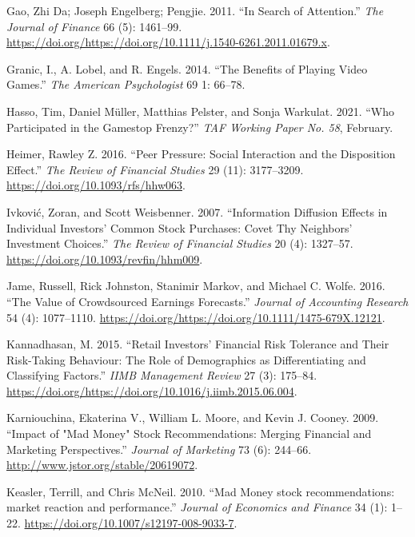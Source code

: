 \documentclass[12pt,]{article}
\begin{document}
\leavevmode\hypertarget{ref-da2011}{}%
Gao, Zhi Da; Joseph Engelberg; Pengjie. 2011. ``In Search of
Attention.'' \emph{The Journal of Finance} 66 (5): 1461--99.
\url{https://doi.org/https://doi.org/10.1111/j.1540-6261.2011.01679.x}.

\leavevmode\hypertarget{ref-granic2014}{}%
Granic, I., A. Lobel, and R. Engels. 2014. ``The Benefits of Playing
Video Games.'' \emph{The American Psychologist} 69 1: 66--78.

\leavevmode\hypertarget{ref-hasso2021}{}%
Hasso, Tim, Daniel Müller, Matthias Pelster, and Sonja Warkulat. 2021.
``Who Participated in the Gamestop Frenzy?'' \emph{TAF Working Paper No.
58}, February.

\leavevmode\hypertarget{ref-heimer2016}{}%
Heimer, Rawley Z. 2016. ``Peer Pressure: Social Interaction and the
Disposition Effect.'' \emph{The Review of Financial Studies} 29 (11):
3177--3209. \url{https://doi.org/10.1093/rfs/hhw063}.

\leavevmode\hypertarget{ref-ivkovic2007}{}%
Ivković, Zoran, and Scott Weisbenner. 2007. ``Information Diffusion
Effects in Individual Investors' Common Stock Purchases: Covet Thy
Neighbors' Investment Choices.'' \emph{The Review of Financial Studies}
20 (4): 1327--57. \url{https://doi.org/10.1093/revfin/hhm009}.

\leavevmode\hypertarget{ref-jame2016}{}%
Jame, Russell, Rick Johnston, Stanimir Markov, and Michael C. Wolfe.
2016. ``The Value of Crowdsourced Earnings Forecasts.'' \emph{Journal of
Accounting Research} 54 (4): 1077--1110.
\url{https://doi.org/https://doi.org/10.1111/1475-679X.12121}.

\leavevmode\hypertarget{ref-kannadhasan2015}{}%
Kannadhasan, M. 2015. ``Retail Investors' Financial Risk Tolerance and
Their Risk-Taking Behaviour: The Role of Demographics as Differentiating
and Classifying Factors.'' \emph{IIMB Management Review} 27 (3):
175--84.
\url{https://doi.org/https://doi.org/10.1016/j.iimb.2015.06.004}.

\leavevmode\hypertarget{ref-karniouchina2009}{}%
Karniouchina, Ekaterina V., William L. Moore, and Kevin J. Cooney. 2009.
``Impact of "Mad Money" Stock Recommendations: Merging Financial and
Marketing Perspectives.'' \emph{Journal of Marketing} 73 (6): 244--66.
\url{http://www.jstor.org/stable/20619072}.

\leavevmode\hypertarget{ref-keasler2010}{}%
Keasler, Terrill, and Chris McNeil. 2010. ``Mad Money stock
recommendations: market reaction and performance.'' \emph{Journal of
Economics and Finance} 34 (1): 1--22.
\url{https://doi.org/10.1007/s12197-008-9033-7}.
\end{document}
